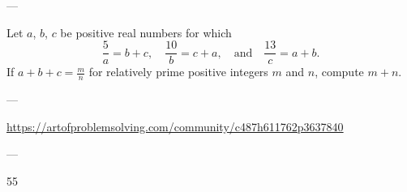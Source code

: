 
---

Let $a$, $b$, $c$ be positive real numbers for which\[
    \frac{5}{a} = b+c, \quad
    \frac{10}{b} = c+a, \quad \text{and} \quad
    \frac{13}{c} = a+b.
\]
If $a+b+c = \frac mn$ for relatively prime positive integers $m$ and $n$, compute $m+n$.

---

\url{https://artofproblemsolving.com/community/c487h611762p3637840}

---

55

